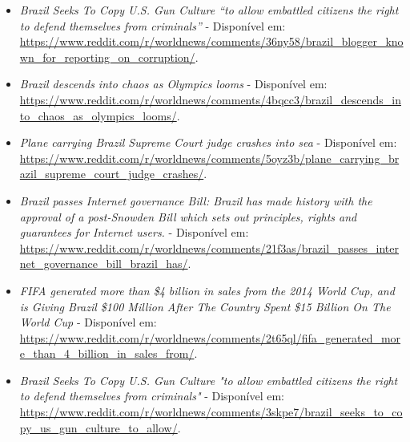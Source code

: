 \begin{itemize}
  \item
  \textit{Brazil Seeks To Copy U.S. Gun Culture ``to allow embattled
  citizens the right to defend themselves from
  criminals''} - Disponível em: 
  \url{https://www.reddit.com/r/worldnews/comments/36ny58/brazil_blogger_known_for_reporting_on_corruption/}.
  \item
  \textit{Brazil descends into chaos as Olympics looms} - Disponível em: 
  \url{https://www.reddit.com/r/worldnews/comments/4bqcc3/brazil_descends_into_chaos_as_olympics_looms/}.
  \item
  \textit{Plane carrying Brazil Supreme Court judge crashes into sea}
   - Disponível em: \url{https://www.reddit.com/r/worldnews/comments/5oyz3b/plane_carrying_brazil_supreme_court_judge_crashes/}.
  \item
  \textit{Brazil passes Internet governance Bill: Brazil has made history with
  the approval of a post-Snowden Bill which sets out principles, rights and guarantees for Internet users.} - Disponível em: \url{https://www.reddit.com/r/worldnews/comments/21f3as/brazil_passes_internet_governance_bill_brazil_has/}.
  \item
  \textit{FIFA generated more than \$4 billion in sales from the 2014 World Cup,
  and is Giving Brazil \$100 Million After The Country Spent \$15 Billion On The
  World Cup} - Disponível em: \url{https://www.reddit.com/r/worldnews/comments/2t65ql/fifa_generated_more_than_4_billion_in_sales_from/}.
  \item
  \textit{Brazil Seeks To Copy U.S. Gun Culture "to allow embattled citizens the
  right to defend themselves from
  criminals"} - Disponível em: \url{https://www.reddit.com/r/worldnews/comments/3skpe7/brazil_seeks_to_copy_us_gun_culture_to_allow/}.
\end{itemize}

